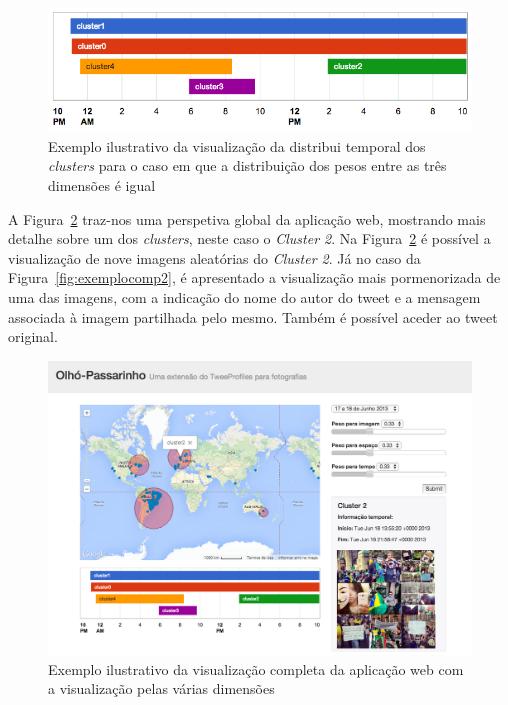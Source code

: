 \begin{figure}[h]
\centering
\includegraphics[width=0.7\linewidth]{./figures/olhopassarinho/time2}
\caption{Exemplo ilustrativo da visualização da distribui temporal dos \textit{clusters} para o caso em que a distribuição dos pesos entre as três dimensões é igual}
\label{fig:time2}
\end{figure}

A Figura~\ref{fig:exemplocomp} traz-nos uma perspetiva global da aplicação web, mostrando mais detalhe sobre um dos \textit{clusters}, neste caso o \textit{Cluster 2}. Na Figura~\ref{fig:exemplocomp} é possível a visualização de nove imagens aleatórias do \textit{Cluster 2}. Já no caso da Figura~\ref{fig:exemplocomp2}, é apresentado a visualização mais pormenorizada de uma das imagens, com a indicação do nome do autor do tweet e a mensagem associada à imagem partilhada pelo mesmo. Também é possível aceder ao tweet original.

\begin{figure}[h]
\centering
\includegraphics[width=0.8\linewidth]{./figures/olhopassarinho/exemplo_comp}
\caption{Exemplo ilustrativo da visualização completa da aplicação web com a visualização pelas várias dimensões}
\label{fig:exemplocomp}
\end{figure}


